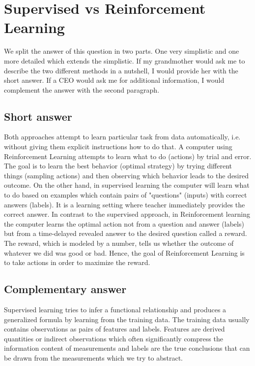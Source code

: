 \documentclass{article}
\begin{document}
\newpage
\section{Supervised vs Reinforcement Learning}
We split the answer of this question in two parts. One very simplistic and one more detailed which extends the simplistic. If my grandmother would ask me to describe the two different methods in a nutshell, I would provide her with the short answer. If a CEO would ask me for additional information, I would complement the answer with the second paragraph.

\subsection{Short answer}
Both approaches attempt to learn particular task from data automatically, i.e. without giving them explicit instructions how to do that. A computer using Reinforcement Learning attempts to learn what to do (actions) by trial and error. The goal is to learn the best behavior (optimal strategy) by trying different things (sampling actions) and then observing which behavior leads to the desired outcome. On the other hand, in supervised learning the computer will learn what to do based on examples which contain pairs of "questions" (inputs) with correct answers (labels). It is a learning setting where teacher immediately provides the correct answer. In contrast to the supervised approach, in Reinforcement learning the computer learns the optimal action not from a question and answer (labels) but from a time-delayed revealed answer to the desired question called a reward. The reward, which is modeled by a number, tells us whether the outcome of whatever we did was good or bad. Hence, the goal of Reinforcement Learning is to take actions in order to maximize the reward. 

\subsection{Complementary answer}
Supervised learning tries to infer a functional relationship and produces a generalized formula by learning from the training data. The training data usually contains observations as pairs of features and labels. Features are derived quantities or indirect observations which often significantly compress the information content of measurements and labels are the true conclusions that can be drawn from the measurements which we try to abstract. \\
\end{document}
